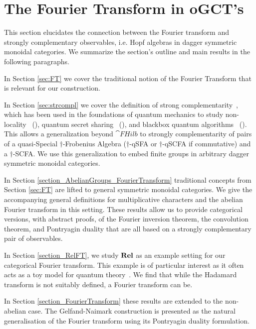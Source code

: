 \section{\color{blue} The Fourier Transform in oGCT's}
\label{sec:strcomplFT}

This section elucidates the connection between the Fourier transform and strongly complementary observables, i.e. Hopf algebras in dagger symmetric monoidal categories. We summarize the section's outline and main results in the following paragraphs.

In Section \ref{sec:FT} we cover the traditional notion of the Fourier Transform that is relevant for our construction.  

In Section \ref{sec:strcompl} we cover the definition of strong complementarity~\cite{coecke2011interacting}, which has been used in the foundations of quantum mechanics to study non-locality~\cite{coecke2012strong, gogioso2015mermin} (), quantum secret sharing~\cite{gogioso2015mermin, zamdzhiev2012abstract} (), and blackbox quantum algorithms~\cite{vicary-tqa, zeng2014abstract, zeng2015models} (). This allows a generalization beyond $\cat{FHilb}$ to strongly complementarity of pairs of a quasi-Special $\dagger$-Frobenius Algebra ($\dagger$-qSFA or $\dagger$-qSCFA if commutative) and a $\dagger$-SCFA. We use this generalization to embed finite groups in arbitrary dagger symmetric monoidal categories.

In Section \ref{section_AbelianGroups_FourierTransform} traditional concepts from Section \ref{sec:FT} are lifted to general symmetric monoidal categories. We give the accompanying general definitions for multiplicative characters and the abelian Fourier transform in this setting.  These results allow us to provide categorical versions, with abstract proofs, of the Fourier inversion theorem, the convolution theorem, and Pontryagin duality that are all based on a strongly complementary pair of observables.

In Section \ref{section_RelFT}, we study $\mathbf{Rel}$ as an example setting for our categorical Fourier transform. This example is of particular interest as it often acts as a toy model for quantum theory~\cite{pavlovic2009quantum, evans2009classifying, cqm-notes, zeng2015models}.  We find that while the Hadamard transform is not suitably defined, a Fourier transform can be.

In Section \ref{section_FourierTransform} these results are extended to the non-abelian case. The Gelfand-Naimark construction is presented as the natural generalisation of the Fourier transform using its Pontryagin duality formulation.

